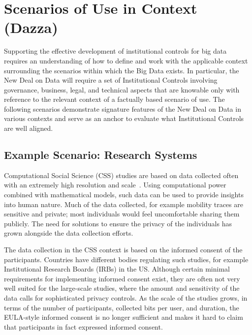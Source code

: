  \section{Scenarios of Use in Context (Dazza)}

Supporting the effective development of institutional controls for big data requires an understanding of how to define and work with the applicable context surrounding the scenarios within which the Big Data exists.
In particular, the New Deal on Data will require a set of Institutional Controls involving governance, business, legal, and technical aspects that are knowable only with reference to the relevant context of a factually based scenario of use.
The following scenarios demonstrate signature features of the New Deal on Data in various contexts and serve as an anchor to evaluate what Institutional Controls are well aligned.

 \subsection{Example Scenario: Research Systems}


Computational Social Science (CSS) studies are based on data collected often with an extremely high resolution and scale~\cite{lazer2009life}.
Using computational power combined with mathematical models, such data can be used to provide insights into human nature.
Much of the data collected, for example mobility traces are sensitive and private; most individuals would feel uncomfortable sharing them publicly.
The need for solutions to ensure the privacy of the individuals has grown alongside the data collection efforts.

The data collection in the CSS context is based on the informed consent of the participants. 
Countries have different bodies regulating such studies, for example Institutional Research Boards (IRBs) in the US. Although certain minimal requirements for implementing informed consent exist, they are often not very well suited for the large-scale studies, where the amount and sensitivity of the data calls for sophisticated privacy controls.
As the scale of the studies grows, in terms of the number of participants, collected bits per user, and duration, the EULA-style informed consent is no longer sufficient and makes it hard to claim that participants in fact expressed informed consent.

